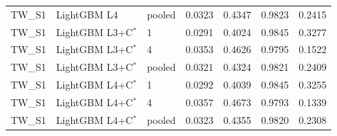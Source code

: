 \begin{tabular}{lllrrrr}
TW\_S1 & LightGBM L4 & pooled & 0.0323 & 0.4347 & 0.9823 & 0.2415 \\
TW\_S1 & LightGBM L3+C$^{*}$ & 1 & 0.0291 & 0.4024 & 0.9845 & 0.3277 \\
TW\_S1 & LightGBM L3+C$^{*}$ & 4 & 0.0353 & 0.4626 & 0.9795 & 0.1522 \\
TW\_S1 & LightGBM L3+C$^{*}$ & pooled & 0.0321 & 0.4324 & 0.9821 & 0.2409 \\
TW\_S1 & LightGBM L4+C$^{*}$ & 1 & 0.0292 & 0.4039 & 0.9845 & 0.3255 \\
TW\_S1 & LightGBM L4+C$^{*}$ & 4 & 0.0357 & 0.4673 & 0.9793 & 0.1339 \\
TW\_S1 & LightGBM L4+C$^{*}$ & pooled & 0.0323 & 0.4355 & 0.9820 & 0.2308 \\
\bottomrule
\end{tabular}
